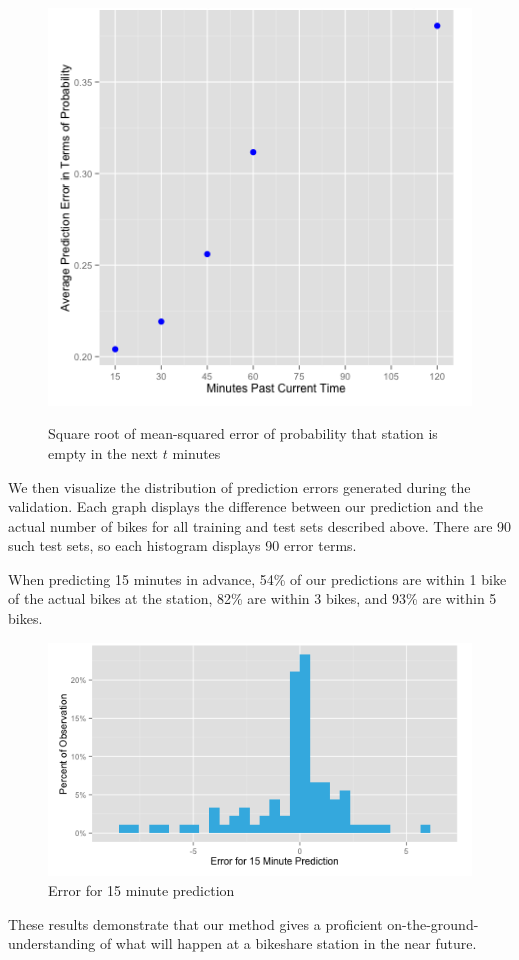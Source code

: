 \documentclass{acm_proc_article-sp}
\begin{document}
\begin{figure} [!h]
\caption{Square root of mean-squared error of probability that station is empty in the next $t$ minutes}
\centering
\includegraphics[scale = 0.4]{mse_ind_poisson.png}
\label{fig:mse_ind_poisson}
\end{figure}

We then visualize the distribution of prediction errors generated during the validation. Each graph displays the difference between our prediction and the actual number of bikes for all training and test sets described above. There are 90 such test sets, so each histogram displays 90 error terms. 

When predicting 15 minutes in advance, 54\% of our predictions are within 1 bike of the actual bikes at the station, 82\% are within 3 bikes, and 93\% are within 5 bikes.
\begin{figure} [!h]
\caption{Error for 15 minute prediction}
\centering
\includegraphics[scale = 0.4]{Error_for_15_Minute.png}
\end{figure}
These results demonstrate that our method gives a proficient on-the-ground-understanding of what will happen at a bikeshare station in the near future.
\end{document}
